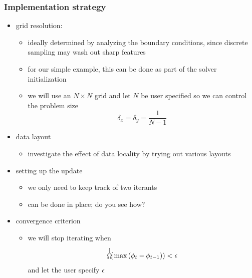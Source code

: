 \begin{frame}[fragile]
%
  \frametitle{Implementation strategy}
%
  \begin{itemize}
%
  \item grid resolution:
    \begin{itemize}
     \item ideally determined by analyzing the boundary conditions, since discrete sampling may
       wash out sharp features
     \item for our simple example, this can be done as part of the solver initialization
     \item we will use an $N \times N$ grid and let $N$ be user specified so we can control the
       problem size
       \begin{equation}
         \delta_{x} = \delta_{y} = \frac{1}{N-1}
       \end{equation}
     \end{itemize}
%
  \item data layout
    \begin{itemize}
    \item investigate the effect of data locality by trying out various layouts
    \end{itemize}
%
  \item setting up the update
    \begin{itemize}
      \item we only need to keep track of two iterants
      \item can be done in place; do you see how?
    \end{itemize}
%
  \item convergence criterion
    \begin{itemize}
    \item we will stop iterating when
      \begin{equation}
        \stackrel[\Omega]{}{\mbox{\rm max}}\, (\phi_{t} - \phi_{t-1})) < \epsilon
      \end{equation}
      and let the user specify $\epsilon$
    \end{itemize}
%
  \end{itemize}
% 
\end{frame}

%

